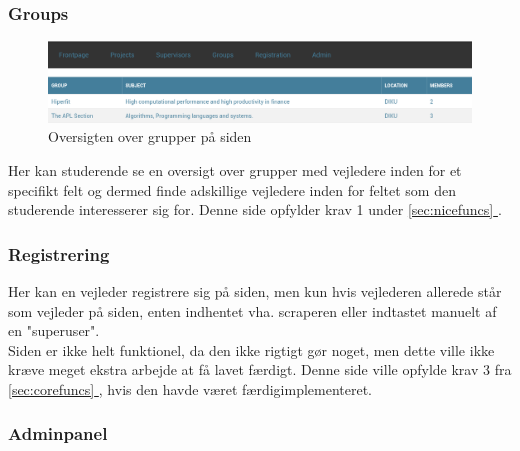 \documentclass[12pt]{article}
\begin{document}
\subsubsection{Groups}
\begin{figure}[H]
    \centering
    \includegraphics[scale=0.33]{frontend_groups.png}
    \caption{Oversigten over grupper på siden}
    \label{fig:frontend_groups}
\end{figure}
Her kan studerende se en oversigt over grupper med vejledere inden for et specifikt felt og dermed finde adskillige vejledere inden for feltet som den studerende interesserer sig for.
Denne side opfylder krav 1 under \hyperref[sec:nicefuncs]{\ref*{sec:nicefuncs} }.

\subsubsection{Registrering}
Her kan en vejleder registrere sig på siden, men kun hvis vejlederen allerede står som vejleder på siden, enten indhentet vha. scraperen eller indtastet manuelt af en "superuser".\\
Siden er ikke helt funktionel, da den ikke rigtigt gør noget, men dette ville ikke kræve meget ekstra arbejde at få lavet færdigt.
Denne side ville opfylde krav 3 fra \hyperref[sec:corefuncs]{\ref*{sec:corefuncs} }, hvis den havde været færdigimplementeret.\\

\subsubsection{Adminpanel}

\newpage
\end{document}
